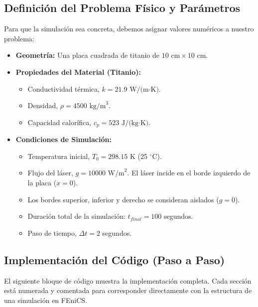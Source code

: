\documentclass[11pt, a4paper]{article}
\begin{document}
\subsection{Definición del Problema Físico y Parámetros}
Para que la simulación sea concreta, debemos asignar valores numéricos a nuestro problema:
\begin{itemize}
    \item \textbf{Geometría:} Una placa cuadrada de titanio de $10 \text{ cm} \times 10 \text{ cm}$.
    \item \textbf{Propiedades del Material (Titanio):}
        \begin{itemize}
            \item Conductividad térmica, $k = 21.9 \text{ W/(m·K)}$.
            \item Densidad, $\rho = 4500 \text{ kg/m}^3$.
            \item Capacidad calorífica, $c_p = 523 \text{ J/(kg·K)}$.
        \end{itemize}
    \item \textbf{Condiciones de Simulación:}
        \begin{itemize}
            \item Temperatura inicial, $T_0 = 298.15 \text{ K}$ (25 $^{\circ}$C).
            \item Flujo del láser, $g = 10000 \text{ W/m}^2$. El láser incide en el borde izquierdo de la placa ($x=0$).
            \item Los bordes superior, inferior y derecho se consideran aislados ($g=0$).
            \item Duración total de la simulación: $t_{final} = 100$ segundos.
            \item Paso de tiempo, $\Delta t = 2$ segundos.
        \end{itemize}
\end{itemize}

\subsection{Implementación del Código (Paso a Paso)}
El siguiente bloque de código muestra la implementación completa. Cada sección está numerada y comentada para corresponder directamente con la estructura de una simulación en FEniCS.
\end{document}
